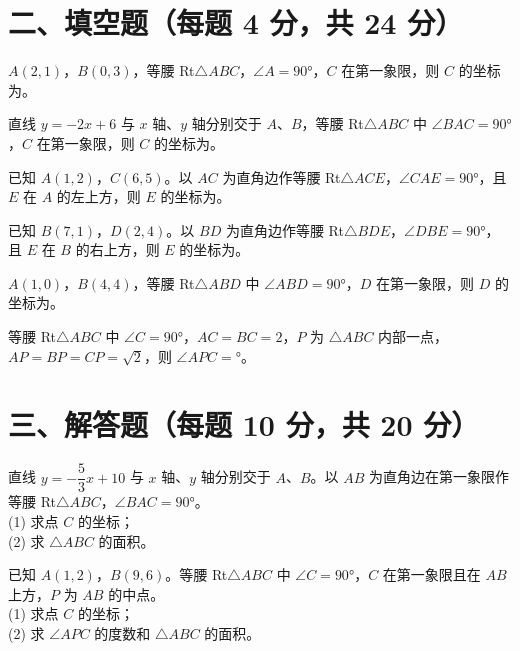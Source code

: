 \documentclass{exam-zh}
\newcommand{\answerarea}[1][40mm]{%
  \vspace{2mm}%
  \begin{tcolorbox}[
    enhanced, breakable,
    colback=white,
    colframe=white,
    boxrule=0pt,
    height=#1,
    valign=top,
    bottom=0mm,
    after skip=0mm,
  ]
  \end{tcolorbox}%
}
\begin{document}
\section*{二、填空题（每题 4 分，共 24 分）}

\begin{question}[points=4]
  $A(2, 1)$，$B(0, 3)$，等腰 Rt$\triangle ABC$，$\angle A = 90°$，$C$ 在第一象限，则 $C$ 的坐标为\fillin。
\end{question}



\begin{question}[points=4]
  直线 $y = -2x + 6$ 与 $x$ 轴、$y$ 轴分别交于 $A$、$B$，等腰 Rt$\triangle ABC$ 中 $\angle BAC = 90°$，$C$ 在第一象限，则 $C$ 的坐标为\fillin。
\end{question}



\begin{question}[points=4]
  已知 $A(1,2)$，$C(6,5)$。以 $AC$ 为直角边作等腰 Rt$\triangle ACE$，$\angle CAE = 90°$，且 $E$ 在 $A$ 的左上方，则 $E$ 的坐标为\fillin。
\end{question}



\begin{question}[points=4]
  已知 $B(7,1)$，$D(2,4)$。以 $BD$ 为直角边作等腰 Rt$\triangle BDE$，$\angle DBE = 90°$，且 $E$ 在 $B$ 的右上方，则 $E$ 的坐标为\fillin。
\end{question}



\begin{question}[points=4]
  $A(1, 0)$，$B(4, 4)$，等腰 Rt$\triangle ABD$ 中 $\angle ABD = 90°$，$D$ 在第一象限，则 $D$ 的坐标为\fillin。
\end{question}



\begin{question}[points=4]
  等腰 Rt$\triangle ABC$ 中 $\angle C = 90°$，$AC = BC = 2$，$P$ 为 $\triangle ABC$ 内部一点，$AP = BP = CP = \sqrt{2}$，则 $\angle APC = $\fillin$°$。
\end{question}


\section*{三、解答题（每题 10 分，共 20 分）}


\begin{problem}[points=10]
  直线 $y = -\dfrac{5}{3}x + 10$ 与 $x$ 轴、$y$ 轴分别交于 $A$、$B$。以 $AB$ 为直角边在第一象限作等腰 Rt$\triangle ABC$，$\angle BAC = 90°$。\\
(1) 求点 $C$ 的坐标；\\
(2) 求 $\triangle ABC$ 的面积。

  \answerarea[70mm]
\end{problem}



\begin{problem}[points=10]
  已知 $A(1,2)$，$B(9,6)$。等腰 Rt$\triangle ABC$ 中 $\angle C = 90°$，$C$ 在第一象限且在 $AB$ 上方，$P$ 为 $AB$ 的中点。\\
(1) 求点 $C$ 的坐标；\\
(2) 求 $\angle APC$ 的度数和 $\triangle ABC$ 的面积。

  \answerarea[70mm]
\end{problem}
\end{document}
